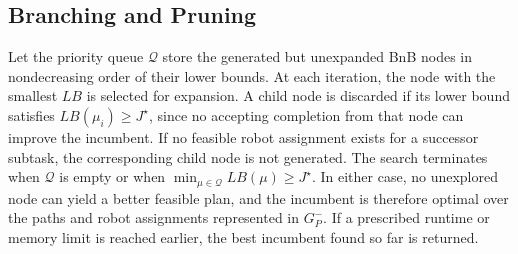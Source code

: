 \documentclass[lettersize,journal]{IEEEtran}
\theoremstyle{italiclemma}
\theoremstyle{italiclemma}
\theoremstyle{definition}
\begin{document}



\subsection{Branching and Pruning}
Let the priority queue $\mathcal Q$ store the generated but unexpanded BnB nodes in nondecreasing order of their lower bounds. At each iteration, the node with the smallest $LB$ is selected for expansion. A child node is discarded if its lower bound satisfies $LB(\mu_i)\geq J^\star$, since no accepting completion from that node
can improve the incumbent. If no feasible robot assignment exists for a successor subtask, the corresponding child node is not generated.
The search terminates when $\mathcal Q$ is empty or when
$\min_{\mu\in\mathcal Q}LB(\mu)\geq J^\star$. In either case, no unexplored node can yield a better feasible plan, and the incumbent is therefore optimal over the paths and robot assignments represented in $G_P^{-}$. If a prescribed runtime or memory limit is reached earlier, the
best incumbent found so far is returned.
\end{document}
